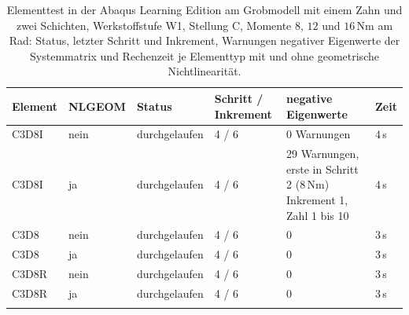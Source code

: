 \begin{table}[htbp]
    \caption{Elementtest in der Abaqus Learning Edition am Grobmodell mit einem Zahn und zwei Schichten, Werkstoffstufe W1, Stellung C, Momente $8$, $12$ und $16$\,Nm am Rad: Status, letzter Schritt und Inkrement, Warnungen negativer Eigenwerte der Systemmatrix und Rechenzeit je Elementtyp mit und ohne geometrische Nichtlinearität.}
    \label{tab:anhang_elementtest}
    \centering
    \footnotesize
    \setlength{\tabcolsep}{4pt}
    \begin{tabular}{llL{2.2cm}L{1.8cm}L{5.2cm}l}
        Element & NLGEOM & Status & Schritt / Inkrement & negative Eigenwerte & Zeit \\
        \hline
        C3D8I & nein & durchgelaufen & 4 / 6 & 0 Warnungen & $4$\,s \\
        \hline
        C3D8I & ja & durchgelaufen & 4 / 6 & 29 Warnungen, erste in Schritt 2 ($8$\,Nm) Inkrement 1, Zahl 1 bis 10 & $4$\,s \\
        \hline
        C3D8 & nein & durchgelaufen & 4 / 6 & 0 & $3$\,s \\
        \hline
        C3D8 & ja & durchgelaufen & 4 / 6 & 0 & $3$\,s \\
        \hline
        C3D8R & nein & durchgelaufen & 4 / 6 & 0 & $3$\,s \\
        \hline
        C3D8R & ja & durchgelaufen & 4 / 6 & 0 & $3$\,s \\
        \hline
    \end{tabular}
\end{table}
